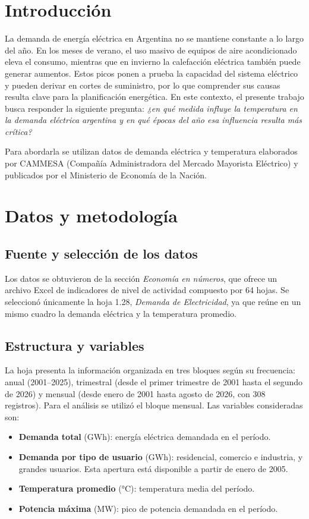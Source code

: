 \documentclass[10pt,a4paper]{article}
\begin{document}
\section{Introducción}
La demanda de energía eléctrica en Argentina no se mantiene constante a lo largo del año. En los meses de verano, el uso masivo de equipos de aire acondicionado eleva el consumo, mientras que en invierno la calefacción eléctrica también puede generar aumentos. Estos picos ponen a prueba la capacidad del sistema eléctrico y pueden derivar en cortes de suministro, por lo que comprender sus causas resulta clave para la planificación energética. En este contexto, el presente trabajo busca responder la siguiente pregunta: \textit{¿en qué medida influye la temperatura en la demanda eléctrica argentina y en qué épocas del año esa influencia resulta más crítica?}

Para abordarla se utilizan datos de demanda eléctrica y temperatura elaborados por CAMMESA (Compañía Administradora del Mercado Mayorista Eléctrico) y publicados por el Ministerio de Economía de la Nación.

\section{Datos y metodología}

\subsection{Fuente y selección de los datos}
Los datos se obtuvieron de la sección \textit{Economía en números}, que ofrece un archivo Excel de indicadores de nivel de actividad compuesto por 64 hojas. Se seleccionó únicamente la hoja 1.28, \textit{Demanda de Electricidad}, ya que reúne en un mismo cuadro la demanda eléctrica y la temperatura promedio.

\subsection{Estructura y variables}
La hoja presenta la información organizada en tres bloques según su frecuencia: anual (2001--2025), trimestral (desde el primer trimestre de 2001 hasta el segundo de 2026) y mensual (desde enero de 2001 hasta agosto de 2026, con 308 registros). Para el análisis se utilizó el bloque mensual. Las variables consideradas son:

\begin{itemize}
  \item \textbf{Demanda total} (GWh): energía eléctrica demandada en el período.
  \item \textbf{Demanda por tipo de usuario} (GWh): residencial, comercio e industria, y grandes usuarios. Esta apertura está disponible a partir de enero de 2005.
  \item \textbf{Temperatura promedio} (°C): temperatura media del período.
  \item \textbf{Potencia máxima} (MW): pico de potencia demandada en el período.
\end{itemize}
\end{document}
